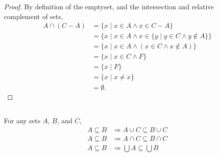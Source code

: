 \documentclass{report}
\begin{document}
\begin{proof}
    By definition of the emptyset, and the intersection and relative complement
      of sets,
      \begin{align*}
        A \cap (C - A)
          & = \{ x \mid x \in A \land x \in C - A \} \\
          & = \{ x \mid x \in A \land
                        x \in \{ y \mid y \in C \land y \not\in A \}\} \\
          & = \{ x \mid x \in A \land (x \in C \land x \not\in A) \} \\
          & = \{ x \mid x \in C \land F \} \\
          & = \{ x \mid F \} \\
          & = \{ x \mid x \neq x \} \\
          & = \emptyset.
      \end{align*}

\end{proof}

\subsection{}%
\label{sub:monotonicity}

For any sets $A$, $B$, and $C$,
  \begin{align*}
    A \subseteq B & \Rightarrow A \cup C \subseteq B \cup C \\
    A \subseteq B & \Rightarrow A \cap C \subseteq B \cap C \\
    A \subseteq B & \Rightarrow \bigcup A \subseteq \bigcup B
  \end{align*}
\end{document}
